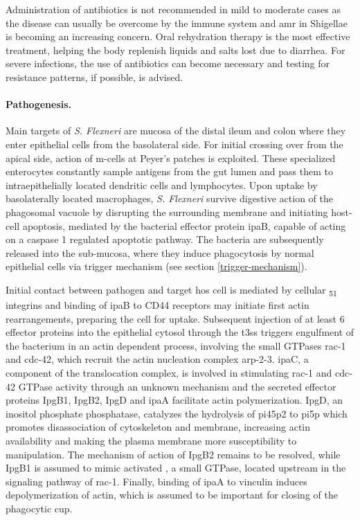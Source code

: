 Administration of antibiotics is not recommended in mild to moderate cases as the disease can usually be overcome by the immune system and \gls{amr} in Shigellae is becoming an increasing concern. Oral rehydration therapy is the most effective treatment, helping the body replenish liquids and salts lost due to diarrhea. For severe infections, the use of antibiotics can become necessary and testing for resistance patterns, if possible, is advised.

\paragraph{Pathogenesis.}
Main targets of \textit{S. Flexneri} are mucosa of the distal ileum and colon where they enter epithelial cells from the basolateral side. For initial crossing over from the apical side, action of \gls{m-cells} at Peyer's patches is exploited. These specialized enterocytes constantly sample antigens from the gut lumen and pass them to intraepithelially located dendritic cells and lymphocytes. Upon uptake by basolaterally located macrophages, \textit{S. Flexneri} survive digestive action of the phagosomal vacuole by disrupting the surrounding membrane and initiating host-cell apoptosis, mediated by the bacterial effector protein \gls{ipa}B, capable of acting on a caspase 1 regulated apoptotic pathway. The bacteria are subsequently released into the sub-mucosa, where they induce phagocytosis by normal epithelial cells via trigger mechanism (see section \ref{trigger-mechanism}).

Initial contact between pathogen and target hos cell is mediated by cellular \textalpha\textsubscript{5}\textbeta\textsubscript{1} integrins and binding of \gls{ipa}B to CD44 receptors may initiate first actin rearrangements, preparing the cell for uptake. Subsequent injection of at least 6 effector proteins into the epithelial cytosol through the \gls{t3ss} triggers engulfment of the bacterium in an actin dependent process, involving the small GTPases \gls{rac-1} and \gls{cdc-42}, which recruit the actin nucleation complex \gls{arp-2-3}. \Gls{ipa}C, a component of the translocation complex, is involved in stimulating \gls{rac-1} and \gls{cdc-42} GTPase activity through an unknown mechanism and the secreted effector proteins IpgB1, IpgB2, IpgD and \gls{ipa}A facilitate actin polymerization. IpgD, an inositol phosphate phosphatase, catalyzes the hydrolysis of \acrshort{pi45p2} to \acrshort{pi5p} which promotes disassociation of cytoskeleton and membrane, increasing actin availability and making the plasma membrane more susceptibility to manipulation. The mechanism of action of IpgB2 remains to be resolved, while IpgB1 is assumed to mimic activated , a small GTPase, located upstream in the signaling pathway of \gls{rac-1}. Finally, binding of \gls{ipa}A to vinculin induces depolymerization of actin, which is assumed to be important for closing of the phagocytic cup.

